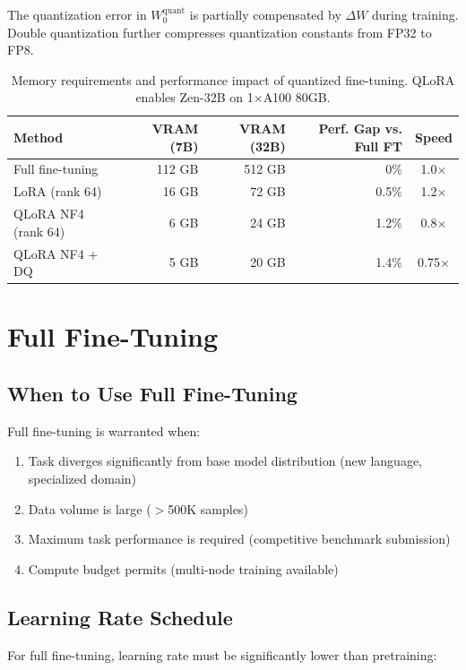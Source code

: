 \documentclass[11pt,a4paper]{article}
\begin{document}
The quantization error in $W_0^\text{quant}$ is partially compensated by $\Delta W$
during training. Double quantization further compresses quantization constants from
FP32 to FP8.

\begin{table}[H]
\centering
\begin{tabular}{lrrrc}
\toprule
\textbf{Method} & \textbf{VRAM (7B)} & \textbf{VRAM (32B)} & \textbf{Perf. Gap vs. Full FT} & \textbf{Speed} \\
\midrule
Full fine-tuning & 112 GB & 512 GB & 0\% & 1.0$\times$ \\
LoRA (rank 64) & 16 GB & 72 GB & 0.5\% & 1.2$\times$ \\
QLoRA NF4 (rank 64) & 6 GB & 24 GB & 1.2\% & 0.8$\times$ \\
QLoRA NF4 + DQ & 5 GB & 20 GB & 1.4\% & 0.75$\times$ \\
\bottomrule
\end{tabular}
\caption{Memory requirements and performance impact of quantized fine-tuning. QLoRA enables Zen-32B on 1$\times$A100 80GB.}
\end{table}

\section{Full Fine-Tuning}

\subsection{When to Use Full Fine-Tuning}

Full fine-tuning is warranted when:
\begin{enumerate}
  \item Task diverges significantly from base model distribution (new language, specialized domain)
  \item Data volume is large ($>$500K samples)
  \item Maximum task performance is required (competitive benchmark submission)
  \item Compute budget permits (multi-node training available)
\end{enumerate}

\subsection{Learning Rate Schedule}

For full fine-tuning, learning rate must be significantly lower than pretraining:
\end{document}
